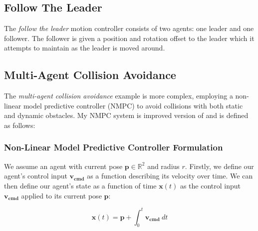 \subsection{Follow The Leader}
\label{sec:follow-the-leader}
The \textit{follow the leader} motion controller consists of two agents: one leader and one follower. The follower is given a position and rotation offset to the leader which it attempts to maintain as the leader is moved around.




\subsection{Multi-Agent Collision Avoidance}
\label{sec:multi-agent-collision-avoidance-implementation}
The \textit{multi-agent collision avoidance} example is more complex, employing a non-linear model predictive controller (NMPC) to avoid collisions with both static and dynamic obstacles. My NMPC system is improved version of \autocite{DBLP:journals/corr/KamelASN17} and is defined as follows:

\subsubsection{Non-Linear Model Predictive Controller Formulation}
\label{sec:nmpc-controller-formulation}
We assume an agent with current pose $\bm{p} \in \mathbb{R}^2$ and radius $r$. Firstly, we define our agent's control input $\bm{v_{cmd}}$ as a function describing its velocity over time. We can then define our agent's state as a function of time $\bm{x}(t)$ as the control input $\bm{v_{cmd}}$ applied to its current pose $\bm{p}$:

\begin{equation}
    \bm{x}(t) = \bm{p} + \int_{0}^{t} \bm{v_{cmd}}\ dt
\end{equation}

